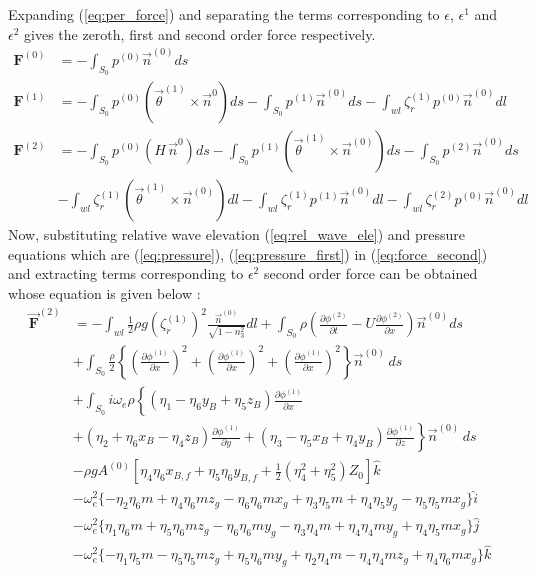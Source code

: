Expanding (\ref{eq:per_force}) and separating the terms corresponding to 
$\epsilon$, $\epsilon^1$ and $\epsilon^2$ gives the zeroth, first and second 
order force respectively. 
\begin{align}
    \label{eq:force_zero}
    \boldsymbol{F}^{(0)} &= -\int_{S_0}p^{(0)}\vec{n}^{(0)} ds \\
    \label{eq:force_first}
    \boldsymbol{F}^{(1)} &= -\int_{S_0} p^{(0)}(\vec{\theta}^{(1)}\times \vec{n}^{0}) ds 
    -\int_{S_0}p^{(1)}\vec{n}^{(0)}ds -\int_{wl}\zeta_r^{(1)}p^{(0)}\vec{n}^{(0)}dl \\
    \label{eq:force_second}
    \boldsymbol{F}^{(2)} &= -\int_{S_0}p^{(0)}(H\,\vec{n}^{0}) ds -\int_{S_0}p^{(1)}(\vec{\theta}^{(1)}
    \times \vec{n}^{(0)})ds - \int_{S_0}p^{(2)}\vec{n}^{(0)}ds \\ \nonumber
    &-\int_{wl}\zeta_r^{(1)}(\vec{\theta}^{(1)}\times \vec{n}^{(0)}) dl 
    -\int_{wl}\zeta_r^{(1)}p^{(1)}\vec{n}^{(0)}dl -\int_{wl}\zeta_r^{(2)}p^{(0)}\vec{n}^{(0)}dl
\end{align}
\newpage
Now, substituting relative wave elevation (\ref{eq:rel_wave_ele})
and pressure equations which are (\ref{eq:pressure}), (\ref{eq:pressure_first})
in (\ref{eq:force_second}) and extracting terms corresponding
to $\epsilon^2$ second order force can be obtained 
whose equation is given below :
\begin{align}     
    \boldsymbol{\vec{F}}^{(2)} &= -\int_{wl}\frac{1}{2}\rho g (\zeta_r^{(1)})^2 \frac{\vec{n}^{(0)}}{\sqrt{1-n_3^2}} dl + 
    \int_{S_0}\rho\left(\frac{\partial \phi^{(2)}}{\partial t} - U\frac{\partial \phi^{(2)}}{\partial x}\right)\vec{n}^{(0)}ds \\ \nonumber
    &+ \int_{S_0} \frac{\rho}{2}\left\{\left(\frac{\partial \phi^{(1)}}{\partial x}\right)^2 + \left(\frac{\partial \phi^{(1)}}{\partial x}\right)^2
    + \left(\frac{\partial \phi^{(1)}}{\partial x}\right)^2\right\}\vec{n}^{(0)} \,ds \\ \nonumber
    &+\int_{S_0}i\omega_e\rho\left\{(\eta_1-\eta_6y_B+\eta_5z_B)\frac{\partial \phi^{(1)}}{\partial x} \right. \\ \nonumber
    &\left. +(\eta_2+\eta_6x_B-\eta_4z_B)\frac{\partial \phi^{(1)}}{\partial y} + (\eta_3-\eta_5x_B+\eta_4y_B)
    \frac{\partial \phi^{(1)}}{\partial z}\right\}\vec{n}^{(0)} \,ds \\ \nonumber
    &- \rho g A^{(0)}\left[\eta_4 \eta_6 x_{B,f} + \eta_5\eta_6 y_{B,f} + \frac{1}{2}(\eta_4^2+\eta_5^2)Z_0\right]\hat{k} \\ \nonumber
    &-\omega^2_e\{-\eta_2\eta_6m + \eta_4\eta_6m z_g -\eta_6\eta_6 m x_g + \eta_3 \eta_5 m + \eta_4\eta_5y_g
    - \eta_5\eta_5 m x_g\} \hat{i} \\ \nonumber
    &-\omega^2_e\{\eta_1\eta_6m + \eta_5\eta_6m z_g -\eta_6\eta_6 m y_g - \eta_3 \eta_4 m + \eta_4 \eta_4 m y_g
    + \eta_4 \eta_5 m x_g\} \hat{j} \\ \nonumber
    &-\omega^2_e\{-\eta_1\eta_5 m - \eta_5\eta_5m z_g +\eta_5\eta_6 m y_g + \eta_2 \eta_4 m - \eta_4 \eta_4 m z_g
    + \eta_4 \eta_6 m x_g\} \hat{k}
\end{align}

